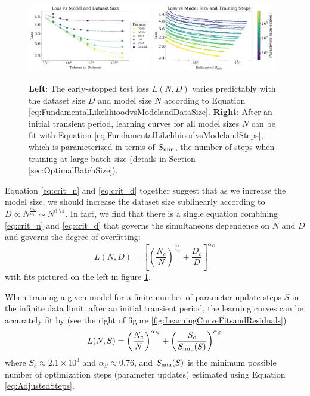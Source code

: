 \documentclass[english]{article}
\newcommand{\be}{\begin{equation}}
\newcommand{\ee}{\end{equation}}
\begin{document}
\begin{figure}
\noindent \centering{} 
\includegraphics[width=0.48\textwidth]{LossvsModelDatasetSize}
\includegraphics[width=0.48\textwidth]{LearningCurveFitComparisonIntro}
\caption[Performance when varying model and data size, or model and training steps, simultaneously]{
{\bf Left}: The early-stopped test loss $L(N, D)$ varies predictably with the dataset size $D$ and model size $N$ according to Equation \eqref{eq:FundamentalLikelihioodvsModelandDataSize}.  
{\bf Right}:  After an initial transient period, learning curves for all model sizes $N$ can be fit with Equation \eqref{eq:FundamentalLikelihioodvsModelandSteps}, which is parameterized in terms of $S_{\rm min}$, the number of steps when training at large batch size (details in Section \ref{sec:OptimalBatchSize}).  \label{fig:LearningCurveFitsandResiduals}
\label{fig:LossvsModelDatasetSize}}
\end{figure}


Equation \eqref{eq:crit_n} and \eqref{eq:crit_d} together suggest that as we increase the model size, we should increase the dataset size sublinearly according to $D \propto N^{\frac{\alpha_N}{\alpha_D}} \sim N^{0.74}$. In fact, we find that there is a single equation combining \eqref{eq:crit_n} and \eqref{eq:crit_d} that governs the simultaneous dependence on $N$ and $D$ and governs the degree of overfitting:
\be
\label{eq:FundamentalLikelihioodvsModelandDataSize}
L(N, D) 
= \left[ \left( \frac{N_c}{N} \right)^{\frac{\alpha_N}{\alpha_D}} + \frac{D_c}{D}  \right]^{\alpha_D}
\ee
with fits pictured on the left in figure \ref{fig:LossvsModelDatasetSize}.

When training a given model for a finite number of parameter update steps $S$ in the infinite data limit, after an initial transient period, the learning curves can be accurately fit by  (see the right of figure \ref{fig:LearningCurveFitsandResiduals})
\be
\label{eq:FundamentalLikelihioodvsModelandSteps}
L(N, S) = \left( \frac{N_c}{N} \right)^{\alpha_N}  + \left( \frac{S_c }{S_{\rm min}(S)} \right)^{\alpha_S}
\ee
where $S_c \approx 2.1 \times 10^3$ and $\alpha_S \approx 0.76$, and $S_{\rm min}(S)$ is the minimum possible number of optimization steps (parameter updates)
estimated  using Equation \eqref{eq:AdjustedSteps}.
\end{document}

